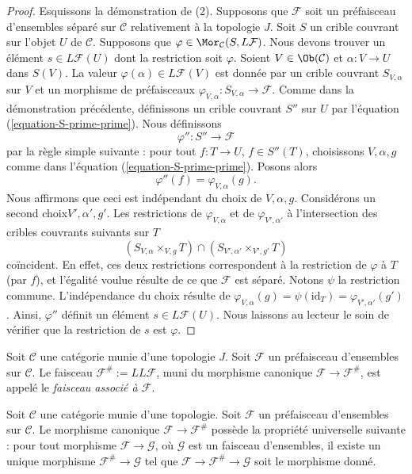 \begin{proof}
\medskip\noindent
Esquissons la démonstration de (2). Supposons que $\mathcal{F}$ soit un
préfaisceau d'ensembles séparé sur $\mathcal{C}$ relativement à
la topologie $J$.
Soit $S$ un crible couvrant sur l'objet $U$ de $\mathcal{C}$.
Supposons que $\varphi \in \Mor_\mathcal{C}(S, L\mathcal{F})$.
Nous devons trouver un élément $s \in L\mathcal{F}(U)$ dont la restriction
soit $\varphi$. Soient $V\in \Ob(\mathcal{C})$ et
$\alpha : V \to U$ dans $S(V)$. La valeur $\varphi(\alpha)
\in L\mathcal{F}(V)$ est donnée par un crible couvrant
$S_{V, \alpha}$ sur $V$ et un morphisme de préfaisceaux
$\varphi_{V, \alpha} : S_{V, \alpha} \to \mathcal{F}$.
Comme dans la démonstration précédente, définissons un crible couvrant $S''$ sur $U$ par
l'équation (\ref{equation-S-prime-prime}). Nous définissons
$$
\varphi'' : S'' \longrightarrow \mathcal{F}
$$
par la règle simple suivante : pour tout $f : T \to U$,
$f \in S''(T)$, choisissons $V, \alpha, g$ comme dans
l'équation (\ref{equation-S-prime-prime}). Posons alors
$$
\varphi''(f) = \varphi_{V, \alpha}(g).
$$
Nous affirmons que ceci est indépendant du
choix de $V, \alpha, g$.
Considérons un second choix$ V', \alpha', g'$.
Les restrictions de $\varphi_{V, \alpha}$ et de
$\varphi_{V', \alpha'}$ à l'intersection
des cribles couvrants suivants sur $T$
$$
(S_{V, \alpha} \times_{V, g} T) \cap (S_{V', \alpha'} \times_{V', g'} T)
$$
coïncident. En effet, ces deux restrictions correspondent à la
restriction de $\varphi$ à $T$ (par $f$), et l'égalité voulue
résulte de ce que $\mathcal{F}$ est séparé.
Notons $\psi$ la restriction commune.
L'indépendance du choix résulte de
$\varphi_{V, \alpha}(g) = \psi(\text{id}_T) =
\varphi_{V', \alpha'}(g')$. Ainsi, $\varphi''$
définit un élément $s \in L\mathcal{F}(U)$. Nous laissons au
lecteur le soin de vérifier que la restriction de $s$ est $\varphi$.
\end{proof}

\begin{definition}
\label{definition-associated-sheaf-topology}
Soit $\mathcal{C}$ une catégorie munie d'une topologie $J$.
Soit $\mathcal{F}$ un préfaisceau d'ensembles sur $\mathcal{C}$.
Le faisceau $\mathcal{F}^\# := LL\mathcal{F}$,
muni du morphisme canonique $\mathcal{F} \to \mathcal{F}^\#$,
est appelé le {\it faisceau associé à $\mathcal{F}$}.
\end{definition}

\begin{proposition}
\label{proposition-sheafification-adjoint-topology}
Soit $\mathcal{C}$ une catégorie munie d'une topologie.
Soit $\mathcal{F}$ un préfaisceau d'ensembles sur $\mathcal{C}$.
Le morphisme canonique $\mathcal{F} \to \mathcal{F}^\#$ possède la
propriété universelle suivante : pour tout morphisme
$\mathcal{F} \to \mathcal{G}$,
où $\mathcal{G}$ est un faisceau d'ensembles, il existe un unique morphisme
$\mathcal{F}^\# \to \mathcal{G}$ tel que $\mathcal{F} \to \mathcal{F}^\#
\to \mathcal{G}$ soit le morphisme donné.
\end{proposition}

